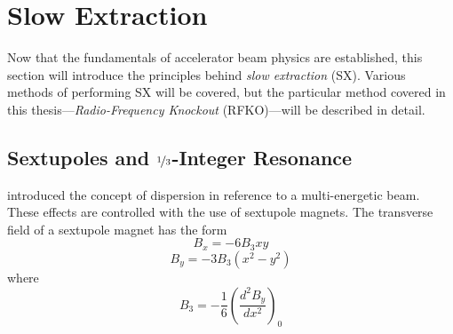 \documentclass[a4paper,twoside,11pt]{report}
\begin{document}
\section{Slow Extraction}\label{sx}
Now that the fundamentals of accelerator beam physics are established, this section will introduce the principles behind \textit{slow extraction} (SX). Various methods of performing SX will be covered, but the particular method covered in this thesis---\textit{Radio-Frequency Knockout} (RFKO)---will be described in detail.

\subsection{Sextupoles and $\nicefrac 13$-Integer Resonance}

 introduced the concept of dispersion in reference to a multi-energetic beam. These effects are controlled with the use of sextupole magnets. The transverse field of a sextupole magnet has the form~\cite[Ch 2.4]{PIMMS}
\begin{equation}
  B_x = -6B_3xy
\end{equation}
\begin{equation}
  B_y = -3B_3(x^2-y^2)
\end{equation} where
\begin{equation}
  B_3=-\frac 16\left(\frac{d^2B_y}{dx^2}\right)_0
\end{equation}
\end{document}
